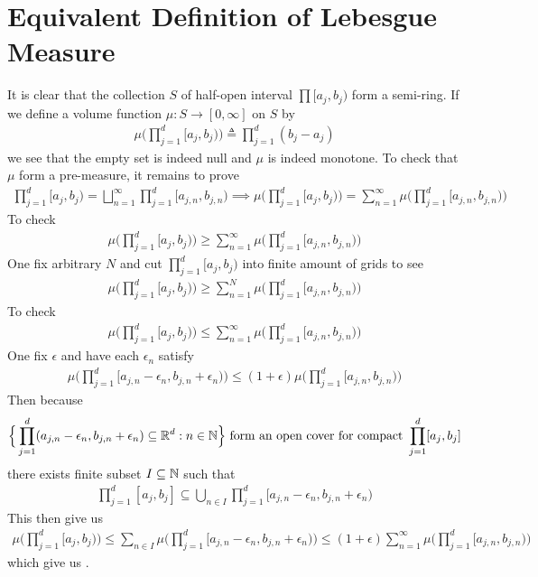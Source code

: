\documentclass{report}
\begin{document}
\section{Equivalent Definition of Lebesgue Measure}
\begin{abstract}

\end{abstract}
\begin{mdframed}
It is clear that the collection $S$ of half-open interval $\prod [a_j,b_j)$ form a semi-ring. If we define a volume function $\mu : S\rightarrow [0,\infty]$ on  $S$ by 
 \begin{align*}
\mu \Big( \prod_{j=1}^d [a_j,b_j) \Big)\triangleq  \prod_{j=1}^d (b_j-a_j)
\end{align*}
we see that the empty set is indeed null and $\mu$ is indeed monotone. To check that $\mu$ form a pre-measure, it remains to prove 
\begin{align*}
\prod_{j=1}^d [a_j,b_j)= \bigsqcup_{n=1}^{\infty} \prod_{j=1}^d [a_{j,n},b_{j,n}) \implies \mu \Big(\prod_{j=1}^d [a_j,b_j) \Big)= \sum_{n=1}^{\infty} \mu \Big(\prod_{j=1}^d [a_{j,n},b_{j,n}) \Big)
\end{align*}
To check 
\begin{align}
\mu \Big(\prod_{j=1}^d [a_j,b_j) \Big) \geq \sum_{n=1}^{\infty} \mu \Big(\prod_{j=1}^d [a_{j,n},b_{j,n}) \Big)
\end{align}
One fix arbitrary $N$ and cut  $\prod_{j=1}^d [a_j,b_j)$ into finite amount of grids to see  
\begin{align*}
\mu \Big(\prod_{j=1}^d [a_j,b_j) \Big) \geq \sum_{n=1}^{N} \mu \Big(\prod_{j=1}^d [a_{j,n},b_{j,n}) \Big)
\end{align*}
To check 
\begin{align}
\label{58}
\mu \Big(\prod_{j=1}^d [a_j,b_j) \Big)\leq \sum_{n=1}^{\infty} \mu \Big(\prod _{j=1}^d [a_{j,n},b_{j,n}) \Big)
\end{align}
One fix $\epsilon$ and have each $\epsilon _n$ satisfy 
\begin{align*}
  \mu \Big(\prod_{j=1}^d [a_{j,n}-\epsilon_n , b_{j,n}+\epsilon_n) \Big) \leq (1+\epsilon )\mu  \Big(\prod_{j=1}^d [a_{j,n},b_{j,n}) \Big)
\end{align*}
Then because  
\begin{align*}
\Big\{ \prod_{j=1}^d (a_{j,n}-\epsilon_n , b_{j,n}+\epsilon_n )\subseteq \mathbb{R}^d:n\in\mathbb{N} \Big\}\text{ form an open cover for compact }\prod_{j=1}^d [a_j,b_j]
\end{align*}
there exists finite subset $I \subseteq \mathbb{N}$ such that 
\begin{align*}
\prod_{j=1}^d [a_j,b_j]\subseteq \bigcup_{n \in I} \prod_{j=1}^d [a_{j,n}-\epsilon _n, b_{j,n}+\epsilon _n)
\end{align*}
This then give us 
\begin{align*}
\mu \Big(\prod_{j=1}^d [a_j,b_j)\Big)\leq \sum_{n \in I}\mu \Big(\prod_{j=1}^d [a_{j,n}-\epsilon _n, b_{j,n}+\epsilon _n) \Big) \leq (1+\epsilon )\sum_{n=1}^{\infty} \mu \Big(\prod_{j=1}^d [a_{j,n},b_{j,n}) \Big)
\end{align*}
which give us .  
\end{mdframed}
\end{document}
